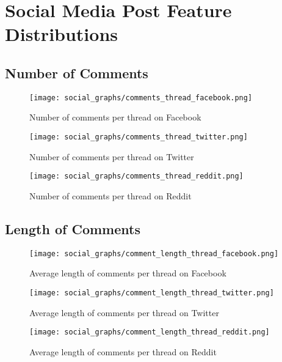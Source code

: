 \chapter{Social Media Post Feature Distributions}
\label{socialgraphs}
\newcommand{\scale}{0.7}

\section{Number of Comments}

\begin{figure}[H]
\centering
\texttt{[image: social\_graphs/comments\_thread\_facebook.png]}
\caption{Number of comments per thread on Facebook}
\label{socialgraphs:comments:facebook}
\end{figure}

\begin{figure}[H]
\centering
\texttt{[image: social\_graphs/comments\_thread\_twitter.png]}
\caption{Number of comments per thread on Twitter}
\label{socialgraphs:comments:twitter}
\end{figure}

\begin{figure}[H]
\centering
\texttt{[image: social\_graphs/comments\_thread\_reddit.png]}
\caption{Number of comments per thread on Reddit}
\label{socialgraphs:comments:reddit}
\end{figure}


\section{Length of Comments}

\begin{figure}[H]
\centering
\texttt{[image: social\_graphs/comment\_length\_thread\_facebook.png]}
\caption{Average length of comments per thread on Facebook}
\label{socialgraphs:length:facebook}
\end{figure}

\begin{figure}[H]
\centering
\texttt{[image: social\_graphs/comment\_length\_thread\_twitter.png]}
\caption{Average length of comments per thread on Twitter}
\label{socialgraphs:length:twitter}
\end{figure}

\begin{figure}[H]
\centering
\texttt{[image: social\_graphs/comment\_length\_thread\_reddit.png]}
\caption{Average length of comments per thread on Reddit}
\label{socialgraphs:length:reddit}
\end{figure}


